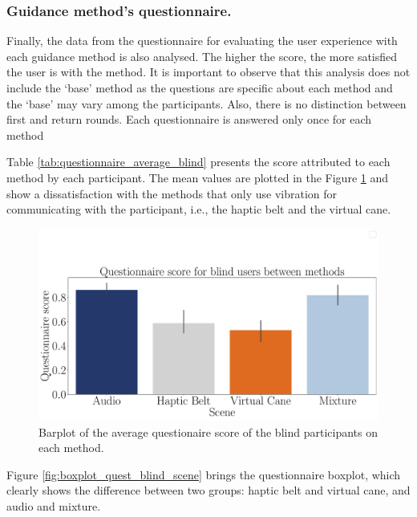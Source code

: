 \subsubsection{Guidance method's questionnaire.}
\label{subsubsec:results_questionnaires}

Finally, the data from the questionnaire for evaluating the user experience with each guidance method is also analysed. The higher the score, the more satisfied the user is with the method. It is important to observe that this analysis does not include the ‘base’ method as the questions are specific about each method and the ‘base’ may vary among the participants. Also, there is no distinction between first and return rounds. Each questionnaire is answered only once for each method

Table \ref{tab:questionnaire_average_blind} presents the score attributed to each method by each participant. The mean values are plotted in the Figure \ref{fig:barplot_questionnaire_scene_blind} and show a dissatisfaction with the methods that only use vibration for communicating with the participant, i.e., the haptic belt and the virtual cane. 



\begin{figure}[!htb]
    \centering
    \includegraphics[width = \textwidth]{Resultados/Questionario/Figuras/pdf/barplot_questionnaire_scene_blind.pdf}
    \caption{Barplot of the average questionaire score of the blind participants on each method.}
    \label{fig:barplot_questionnaire_scene_blind}
\end{figure}

Figure \ref{fig:boxplot_quest_blind_scene} brings the questionnaire boxplot, which clearly shows the difference between two groups: haptic belt and virtual cane, and audio and mixture. 


